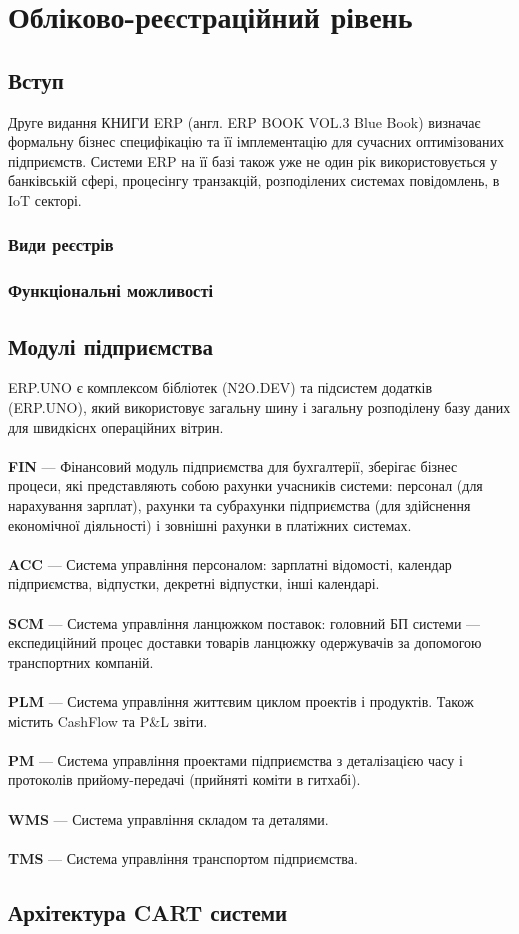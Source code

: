 \chapter{Обліково-реєстраційний рівень}

\section{Вступ}

Друге видання КНИГИ ERP (англ. ERP BOOK VOL.3 Blue Book) визначає формальну
бізнес специфікацію та її імплементацію для сучасних оптимізованих підприємств.
Системи ERP на її базі також уже не один рік використовується у банківській сфері,
процесінгу транзакцій, розподілених системах повідомлень, в IoT секторі.

\subsection{Види реєстрів}

\subsection{Функціональні можливості}

\newpage
\section{Модулі підприємства}

ERP.UNO є комплексом бібліотек (N2O.DEV) та підсистем додатків (ERP.UNO),
який використовує загальну шину і загальну розподілену базу даних для швидкіснх операційних вітрин.
\\
\\
\textbf{FIN} — Фінансовий модуль підприємства для бухгалтерії, зберігає бізнес процеси,
        які представляють собою рахунки учасників системи: персонал (для нарахування зарплат),
        рахунки та субрахунки підприємства (для здійснення економічної діяльності) і
        зовнішні рахунки в платіжних системах.
\\
\\
\textbf{ACC} — Система управління персоналом: зарплатні відомості,
        календар підприємства, відпустки, декретні відпустки, інші календарі.
\\
\\
\textbf{SCM} — Система управління ланцюжком поставок: головний БП системи —
           експедиційний процес доставки товарів ланцюжку одержувачів
           за допомогою транспортних компаній.
\\
\\
\textbf{PLM} — Система управління життєвим циклом проектів і продуктів.
           Також містить CashFlow та P\&L звіти.
\\
\\
\textbf{PM} — Система управління проектами підприємства з деталізацією
           часу і протоколів прийому-передачі (прийняті коміти в гитхабі).
\\
\\
\textbf{WMS} — Система управління складом та деталями.
\\
\\
\textbf{TMS} — Система управління транспортом підприємства.

\section{Архітектура CART системи}

